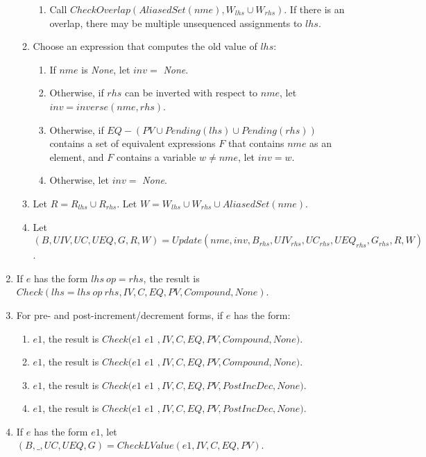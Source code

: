 \begin{enumerate}
\begin{enumerate}
\begin{enumerate}
\item Call $CheckOverlap(AliasedSet(nme), W_{lhs} \cup W_{rhs})$.  If there is 
an overlap, there may be multiple unsequenced assignments to $lhs$.
\end{enumerate}
\item Choose an expression that computes the old value of $lhs$:
\label{list:check-lval-original}
\begin{enumerate}
\item If $nme$ is {\it None}, let $inv = $ {\it None}.
\item Otherwise, if $rhs$ can be inverted with respect to $nme$, let $inv = inverse(nme, rhs)$. 
\item Otherwise, if $EQ - (PV \cup Pending(lhs) \cup Pending(rhs))$ contains a set of equivalent expressions $F$ that contains $nme$ as  an element, and $F$ contains a variable $w \neq nme$, let $inv = w$.
\item Otherwise, let $inv = $ {\it None}.
\end{enumerate}
\item Let $R = R_{lhs} \cup R_{rhs}$.  Let $W = W_{lhs} \cup W_{rhs} \cup AliasedSet(nme)$.
\item Let $(B, UIV, \mathit{UC}, UEQ, G, R, W) = Update(nme, inv, B_{rhs}, \mathit{UIV}_{rhs}, 
                                                                         \mathit{UC}_{rhs}, UEQ_{rhs}, G_{rhs}, R, W)$.
\label{list:check-lval-update}
\end{enumerate}


\item If $e$ has the form $lhs~op= rhs$, the result is 
$Check(lhs = lhs~op~rhs, IV, C, EQ, PV, Compound, None)$.
\item For pre- and post-increment/decrement forms, if $e$ has the form:
\begin{enumerate}
\item \code{++}$e1$, the result is  $Check(e1$ \code{ = } $e1$ $, IV, C, EQ, PV,
Compound, None)$.
\item \code{--}$e1$, the result is $Check(e1$ \code{ = } $e1$ $, IV, C, EQ, PV,
Compound, None)$.
\item $e1$\code{++}, the result is  $Check(e1$ \code{ = } $ e1$ $, IV,
C, EQ, PV, PostIncDec, None)$.
\item $e1$\code{--}, the result is $Check(e1$ \code{ = } $ e1$ $, IV, C, EQ, PV,
        PostIncDec, None)$.
\end{enumerate}
\item If $e$ has the form \code{&}$e1$, let $(B, \_, \mathit{UC}, UEQ, G) = CheckLValue(e1, IV, C, EQ, PV)$.
      

\end{enumerate}
